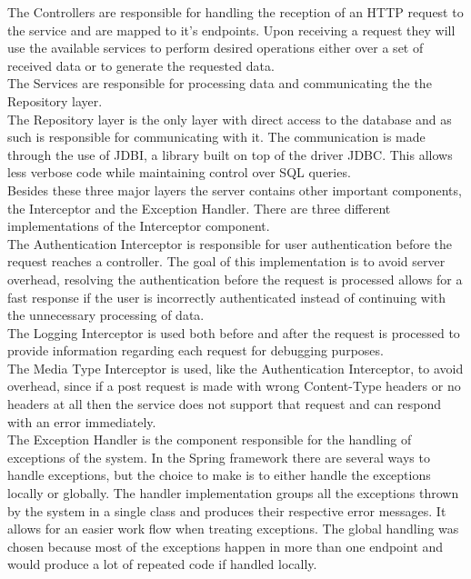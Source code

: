 The Controllers are responsible for handling the reception of an HTTP request to the service and are mapped to
it's endpoints. Upon receiving a request they will use the available services to perform desired operations either
over a set of received data or to generate the requested data.\\

The Services are responsible for processing data and communicating the the Repository layer.\\

The Repository layer is the only layer with direct access to the database and as such is responsible for communicating
with it. The communication is made through the use of JDBI, a library built on top of the driver JDBC. This allows
less verbose code while maintaining control over SQL queries.\\ 

Besides these three major layers the server contains other important components, the Interceptor and the Exception Handler.
There are three different implementations of the Interceptor component.\\

The Authentication Interceptor is responsible for user authentication before the request reaches a controller. The goal of this
implementation is to avoid server overhead, resolving the authentication before the request is processed allows for a fast response
if the user is incorrectly authenticated instead of continuing with the unnecessary processing of data.\\

The Logging Interceptor is used both before and after the request is processed to provide information regarding each request for debugging
purposes.\\

The Media Type Interceptor is used, like the Authentication Interceptor, to avoid overhead, since if a post request is made
with wrong Content-Type headers or no headers at all then the service does not support that request and can respond with an 
error immediately.\\

The Exception Handler is the component responsible for the handling of exceptions of the system. In the Spring framework there 
are several ways to handle exceptions, but the choice to make is to either handle the exceptions locally or globally. The 
handler implementation groups all the exceptions thrown by the system in a single class and produces their respective error 
messages. It allows for an easier work flow when treating exceptions. The global handling was chosen because most of the 
exceptions happen in more than one endpoint and would produce a lot of repeated code if handled locally.\\      

